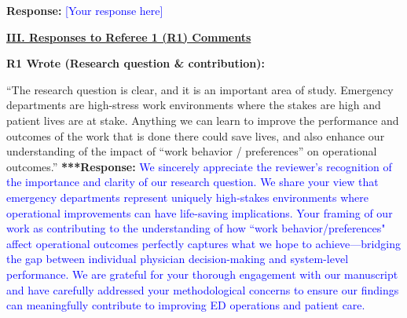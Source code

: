 \documentclass[11pt]{article}
\newenvironment{quote2}
{ \bigskip
\noindent
         \small\em
         \baselineskip=14pt
}
\newcommand{\1}{\hbox{\rm 1\kern-.35em 1}}
\begin{document}
{\begin{quote2}
\end{quote2}

\noindent\textbf{Response:} \textcolor{blue}{[Your response here]}




\clearpage


\pagestyle{fancy}
\fancyhead{}
\renewcommand{\headrulewidth}{0pt}

\noindent\underline{\textbf{III. Responses to Referee 1 (R1) Comments}}

\begin{quote2}
\textbf{R1 Wrote (Research question \& contribution):}  

\noindent``The research question is clear, and it is an important area of study. Emergency departments are
high-stress work environments where the stakes are high and patient lives are at stake.
Anything we can learn to improve the performance and outcomes of the work that is done there
could save lives, and also enhance our understanding of the impact of “work behavior /
preferences” on operational outcomes.” 
\end{quote2}

\noindent\textbf{***Response:} \textcolor{blue}{We sincerely appreciate the reviewer's recognition of the importance and clarity of our research question. We share your view that emergency departments represent uniquely high-stakes environments where operational improvements can have life-saving implications. Your framing of our work as contributing to the understanding of how ``work behavior/preferences" affect operational outcomes perfectly captures what we hope to achieve—bridging the gap between individual physician decision-making and system-level performance. We are grateful for your thorough engagement with our manuscript and have carefully addressed your methodological concerns to ensure our findings can meaningfully contribute to improving ED operations and patient care.}


}
\end{document}
